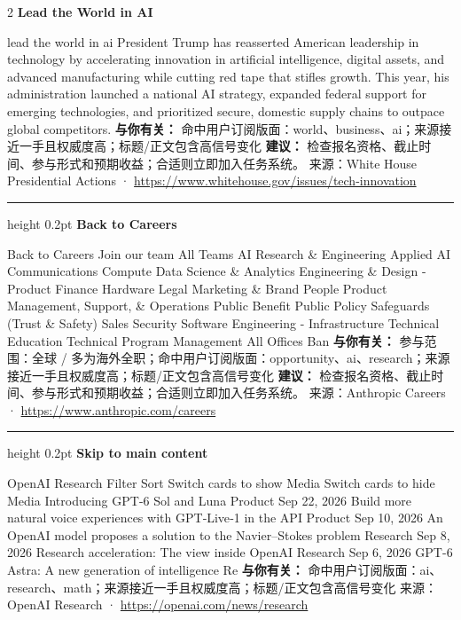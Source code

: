 \documentclass[10.5pt]{ctexart}
\begin{document}
\begin{multicols}{2}
{\large\bfseries Lead the World in AI}\par
lead the world in ai President Trump has reasserted American leadership in technology by accelerating innovation in artificial intelligence, digital assets, and advanced manufacturing while cutting red tape that stifles growth. This year, his administration launched a national AI strategy, expanded federal support for emerging technologies, and prioritized secure, domestic supply chains to outpace global competitors.
\textbf{与你有关：} 命中用户订阅版面：world、business、ai；来源接近一手且权威度高；标题/正文包含高信号变化
\textbf{建议：} 检查报名资格、截止时间、参与形式和预期收益；合适则立即加入任务系统。
{\footnotesize\color{ormuted} 来源：White House Presidential Actions · \url{https://www.whitehouse.gov/issues/tech-innovation}}
\vspace{2mm}
\hrule height 0.2pt
\vspace{2mm}
{\large\bfseries Back to Careers}\par
Back to Careers Join our team All Teams AI Research \& Engineering Applied AI Communications Compute Data Science \& Analytics Engineering \& Design - Product Finance Hardware Legal Marketing \& Brand People Product Management, Support, \& Operations Public Benefit Public Policy Safeguards (Trust \& Safety) Sales Security Software Engineering - Infrastructure Technical Education Technical Program Management All Offices Ban
\textbf{与你有关：} 参与范围：全球 / 多为海外全职；命中用户订阅版面：opportunity、ai、research；来源接近一手且权威度高；标题/正文包含高信号变化
\textbf{建议：} 检查报名资格、截止时间、参与形式和预期收益；合适则立即加入任务系统。
{\footnotesize\color{ormuted} 来源：Anthropic Careers · \url{https://www.anthropic.com/careers}}
\vspace{2mm}
\hrule height 0.2pt
\vspace{2mm}
{\large\bfseries Skip to main content}\par
OpenAI Research Filter Sort Switch cards to show Media Switch cards to hide Media Introducing GPT-6 Sol and Luna Product Sep 22, 2026 Build more natural voice experiences with GPT‑Live‑1 in the API Product Sep 10, 2026 An OpenAI model proposes a solution to the Navier–Stokes problem Research Sep 8, 2026 Research acceleration: The view inside OpenAI Research Sep 6, 2026 GPT-6 Astra: A new generation of intelligence Re
\textbf{与你有关：} 命中用户订阅版面：ai、research、math；来源接近一手且权威度高；标题/正文包含高信号变化
{\footnotesize\color{ormuted} 来源：OpenAI Research · \url{https://openai.com/news/research}}

\end{multicols}
\end{document}
